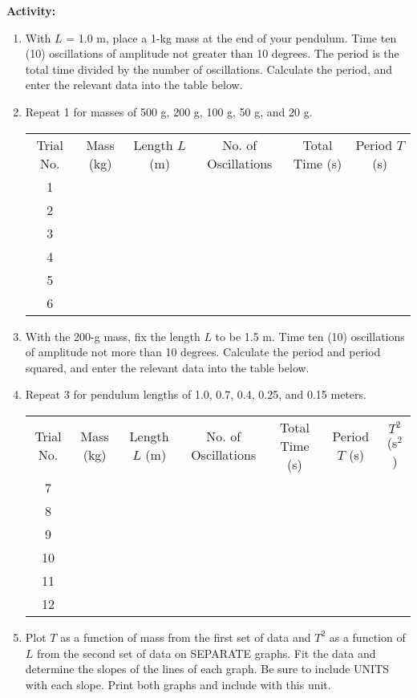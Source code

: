 \medskip
{\noindent \bf Activity:} \begin{enumerate}

\item With $L$ = 1.0 m, place a 1-kg mass at the end of your pendulum. Time ten (10) oscillations of amplitude not greater than 10 degrees. The period is the total time divided by the number of oscillations. Calculate the period, and enter the relevant data into the table below.

\item Repeat 1 for masses of 500 g, 200 g, 100 g, 50 g, and 20 g.

\begin{center}
\renewcommand{\arraystretch}{1.1}{
\begin{tabular}{|c|c|c|c|c|c|} \hline 
Trial No. & Mass (kg) & Length $L$ (m) & No. of Oscillations& Total Time (s) & Period $T$ (s) \\ 
\hhline{|=|=|=|=|=|=|}
1 & & & & & \\ \hline 
2 & & & & & \\ \hline 
3 & & & & & \\ \hline 
4 & & & & & \\ \hline 
5 & & & & & \\ \hline
 6 & & & & & \\ \hline 
\end{tabular} }
\end{center}

\item With the 200-g mass, fix the length $L$ to be 1.5 m. Time ten (10) oscillations of amplitude not more than 10 degrees. Calculate the period and period squared, and enter the relevant data into the table below.

\item Repeat 3 for pendulum lengths of 1.0, 0.7, 0.4, 0.25, and 0.15 meters.

\begin{center}
\renewcommand{\arraystretch}{1.1}{
\begin{tabular}{|c|c|c|c|c|c|c|} \hline
Trial No. & Mass (kg) & Length $L$ (m) & No. of Oscillations& Total Time (s) & Period $T$ (s) & $T^2$ (s$^2$)\\ 
\hhline{|=|=|=|=|=|=|=|}
7 & & & & & & \\ \hline 
8 & & & & & & \\ \hline 
9 & & & & & & \\ \hline 
10 & & & & & & \\ \hline 
11 & & & & & & \\ \hline
12 &  & & & & & \\ \hline 
\end{tabular} }
\end{center}

\item Plot $T$ as a function of mass from the first set of data and $T^2$ as a function of $L$ from the second set of data on SEPARATE graphs. Fit the data and determine the slopes of the lines of each graph. Be sure to include UNITS with each slope. Print both graphs and include with this unit.

\end{enumerate}

